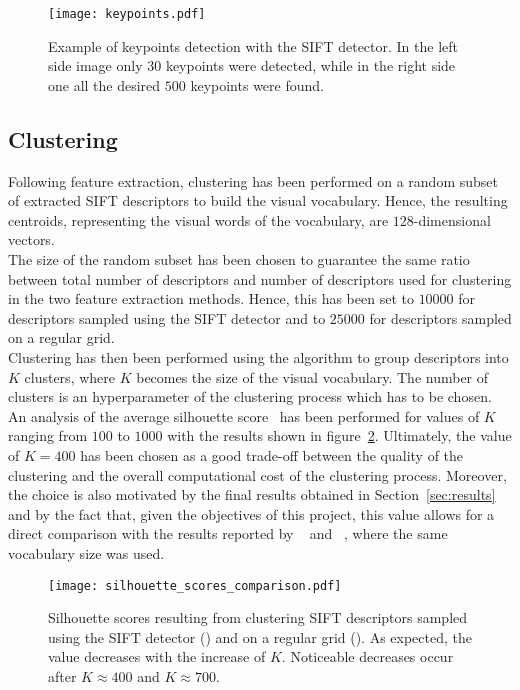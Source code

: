\documentclass[../main.tex]{subfiles}
\begin{document}
\begin{figure}[H]
  \centering
  \texttt{[image: keypoints.pdf]}
  \caption{Example of keypoints detection with the SIFT detector. In the left
  side image only $30$ keypoints were detected, while in the right side one all
the desired $500$ keypoints were found.}
  \label{fig:keypoints-example}
\end{figure}


\subsection{Clustering}\label{subsec:clustering}

Following feature extraction, clustering has been performed on a random subset
of extracted SIFT descriptors to build the visual vocabulary. Hence, the
resulting centroids, representing the visual words of the vocabulary, are
$128$-dimensional vectors.\\
The size of the random subset has been chosen to guarantee the same ratio between 
total number of descriptors and number of descriptors used for
clustering in the two feature extraction methods. Hence, this has been set to
$\num{10000}$ for descriptors sampled using the SIFT detector and to
$\num{25000}$ for descriptors sampled on a regular grid.\\
Clustering has then been performed using the  algorithm to group
descriptors into $K$ clusters, where $K$ becomes the size of the visual
vocabulary. The number of clusters is an hyperparameter of the
clustering process which has to be chosen. An analysis of the average silhouette
score~\cite{silhouette} has been performed for values of $K$ ranging from $100$
to $1000$ with the results shown in figure~\ref{fig:silhouette-score}.
Ultimately, the value of $K=400$ has been chosen as a good trade-off between the
quality of the clustering and the overall computational cost of the clustering process.
Moreover, the choice is also motivated by the final results obtained in
Section~\ref{sec:results} and by the fact that, given the objectives of
this project, this value allows for a direct comparison with the results
reported by ~\cite{lazebnik} and ~\cite{gemert}, where the same vocabulary
size was used.
\begin{figure}[htb]
  \centering
  \texttt{[image: silhouette\_scores\_comparison.pdf]}
  \caption{Silhouette scores resulting from
  clustering SIFT descriptors sampled using the SIFT detector ()
and on a regular grid (). As expected, the value decreases with the
increase of $K$. Noticeable decreases occur after $K\approx400$ and $K\approx700$.}
  \label{fig:silhouette-score}
\end{figure}
\end{document}
